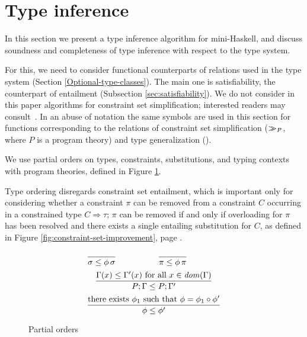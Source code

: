 \section{Type inference}
\label{sec:type-inference}

In this section we present a type inference algorithm for
mini-Haskell, and discuss soundness and completeness of type inference
with respect to the type system.

For this, we need to consider functional counterparts of relations
used in the type system (Section \ref{Optional-type-classes}). The
main one is satisfiability, the counterpart of entailment (Subsection
\ref{sec:satisfiability}).  We do not consider in this paper
algorithms for constraint set simplification; interested readers may
consult~\cite{OutsideIn2011}. In an abuse of notation the same symbols
are used in this section for functions corresponding to the relations
of constraint set simplification ($>\!\!\!>_{P}$, where $P$ is a
program theory) and type generalization (\gen).

We use partial orders on types, constraints, substitutions, and typing
contexts with program theories, defined in Figure \ref{Order}.

Type ordering disregards constraint set entailment, which is important
only for considering whether a constraint $\pi$ can be removed from a
constraint $C$ occurring in a constrained type $C \Rightarrow \tau$;
$\pi$ can be removed if and only if overloading for $\pi$ has been
resolved and there exists a single entailing substitution for $C$, as
defined in Figure \ref{fig:constraint-set-improvement}, page
\pageref{fig:constraint-set-improvement}.

\begin{figure}
   \[ \begin{array}{cc}
   	\displaystyle\frac
          {}
          {\sigma \leq \phi\,\sigma}
   	  & 
   	\displaystyle\frac
   	  {}
   	  {\pi \leq \phi\,\pi} \\[.4cm]
        \multicolumn{2}{c}{
          \displaystyle\frac
	    {\Gamma(x) \leq \Gamma'(x) \text{ for all } x\in \dom{\Gamma}}
	    {P;\Gamma \leq P;\Gamma'}}\\[.4cm]
        \multicolumn{2}{c}{
          \displaystyle\frac
          {\text{there exists $\phi_1$ such that $\phi = \phi_1 \circ \phi'$}}
          {\phi\leq \phi'}}
  \end{array} \]
\caption{Partial orders}
\label{Order}
\end{figure}

